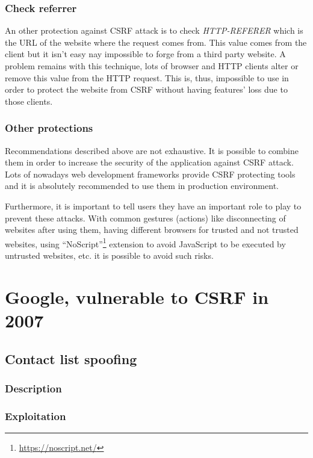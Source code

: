 \documentclass[a4paper,11pt,openany]{report}
\begin{document}
  \subsubsection{Check referrer}
  An other protection against CSRF attack is to check \textit{HTTP-REFERER} which is the URL of the 
  website where the request comes from. This value comes from the client but it isn't easy nay impossible 
  to forge from a third party website. A problem remains with this technique, lots of browser and HTTP 
  clients alter or remove this value from the HTTP request. This is, thus, impossible to use in order 
  to protect the website from CSRF without having features' loss due to those clients.
  
  
  \subsubsection{Other protections}  
  Recommendations described above are not exhaustive. It is possible to combine them in order to increase 
  the security of the application against CSRF attack. Lots of nowadays web development frameworks provide 
  CSRF protecting tools and it is absolutely recommended to use them in production environment.
  
  Furthermore, it is important to tell users they have an important role to play to prevent these attacks. 
  With common gestures (actions) like disconnecting of websites after using them, having different browsers 
  for trusted and not trusted websites, using ``NoScript''\footnote{\url{https://noscript.net/}} extension to avoid JavaScript to be executed by 
  untrusted websites, etc. it is possible to avoid such risks.
  
  \section{Google, vulnerable to CSRF in 2007}
  
  \subsection{Contact list spoofing}
  \subsubsection{Description}
  \subsubsection{Exploitation}
\end{document}
